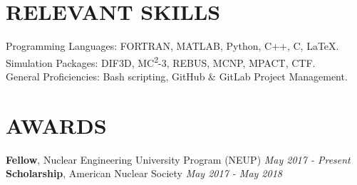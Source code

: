 \documentclass[letterpaper,10pt,nocolor,final]{moderncv}
\begin{document}
\section{RELEVANT  SKILLS}

{Programming Languages:} FORTRAN, MATLAB, Python, C++, C, \LaTeX. \\
{Simulation Packages:} DIF3D, MC\textsuperscript{2}-3, REBUS, MCNP, MPACT, 
  CTF. \\
{General Proficiencies:} Bash scripting, GitHub \& GitLab Project 
  Management.

\section{AWARDS}
\textbf{Fellow}, Nuclear Engineering University Program (NEUP) \hfill 
  \textit{May 2017 - Present} \\
\textbf{Scholarship}, American Nuclear Society \hfill 
  \textit{May 2017 - May 2018}
\end{document}

